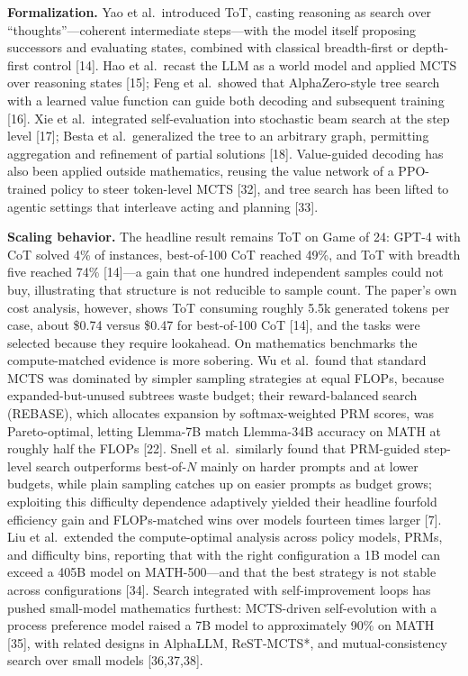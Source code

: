 \documentclass[10pt]{article}
\begin{document}
\textbf{Formalization.} Yao et al.\ introduced ToT, casting reasoning as search over ``thoughts''---coherent intermediate steps---with the model itself proposing successors and evaluating states, combined with classical breadth-first or depth-first control [14]. Hao et al.\ recast the LLM as a world model and applied MCTS over reasoning states [15]; Feng et al.\ showed that AlphaZero-style tree search with a learned value function can guide both decoding and subsequent training [16]. Xie et al.\ integrated self-evaluation into stochastic beam search at the step level [17]; Besta et al.\ generalized the tree to an arbitrary graph, permitting aggregation and refinement of partial solutions [18]. Value-guided decoding has also been applied outside mathematics, reusing the value network of a PPO-trained policy to steer token-level MCTS [32], and tree search has been lifted to agentic settings that interleave acting and planning [33].

\textbf{Scaling behavior.} The headline result remains ToT on Game of 24: GPT-4 with CoT solved 4\% of instances, best-of-100 CoT reached 49\%, and ToT with breadth five reached 74\% [14]---a gain that one hundred independent samples could not buy, illustrating that structure is not reducible to sample count. The paper's own cost analysis, however, shows ToT consuming roughly 5.5k generated tokens per case, about \$0.74 versus \$0.47 for best-of-100 CoT [14], and the tasks were selected because they require lookahead. On mathematics benchmarks the compute-matched evidence is more sobering. Wu et al.\ found that standard MCTS was dominated by simpler sampling strategies at equal FLOPs, because expanded-but-unused subtrees waste budget; their reward-balanced search (REBASE), which allocates expansion by softmax-weighted PRM scores, was Pareto-optimal, letting Llemma-7B match Llemma-34B accuracy on MATH at roughly half the FLOPs [22]. Snell et al.\ similarly found that PRM-guided step-level search outperforms best-of-$N$ mainly on harder prompts and at lower budgets, while plain sampling catches up on easier prompts as budget grows; exploiting this difficulty dependence adaptively yielded their headline fourfold efficiency gain and FLOPs-matched wins over models fourteen times larger [7]. Liu et al.\ extended the compute-optimal analysis across policy models, PRMs, and difficulty bins, reporting that with the right configuration a 1B model can exceed a 405B model on MATH-500---and that the best strategy is not stable across configurations [34]. Search integrated with self-improvement loops has pushed small-model mathematics furthest: MCTS-driven self-evolution with a process preference model raised a 7B model to approximately 90\% on MATH [35], with related designs in AlphaLLM, ReST-MCTS*, and mutual-consistency search over small models [36,37,38].
\end{document}
